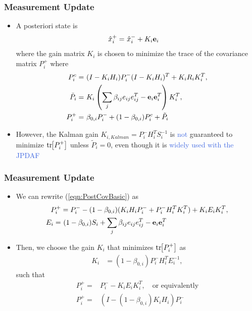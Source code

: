 \documentclass[hyperref={pdftex,pdfpagemode=none,pdfstartview=FitH},10pt]{beamer}
\newcommand{\bracket}[1]{\ensuremath{\left[ #1 \right]}}
\newcommand{\parenth}[1]{\ensuremath{\left( #1 \right)}}
\newcommand{\refeqn}[1]{(\ref{eqn:#1})}
\newcommand{\tr}[1]{\mbox{tr}\ensuremath{\negthickspace\bracket{#1}}}
\def\Emph{\textcolor{RoyalBlue}}
\begin{document}
\begin{frame}
\frametitle{Measurement Update}

\begin{itemize}
\item A posteriori state is
\begin{align}
\hat x^+_{i}=&\ \hat x^-_{i}+K_{i}{\bf{e}}_{i}
\end{align}
where the gain matrix $K_i$ is chosen to minimize the trace of the covariance matrix $P^+_{i}$ where
\begin{align}
P^c_i=&\ (I-K_iH_i)P^-_i(I-K_iH_i)^T+K_iR_iK_i^T,
\\
\tilde P_i=&\ K_i\parenth{{\sum\limits_{j} \beta_{ij}e_{ij}e_{ij}^T-{\bf{e}}_{i}}{\bf{e}}_{i}^T}K_{i}^T,
\\
P^+_{i}=&\ \beta_{0,i}P^-_{i}+(1-\beta_{0,i})P_i^c+\tilde P_i \label{eqn:PostCovBasic}
\end{align}
\item However, the Kalman gain $K_{i,Kalman}=P^-_iH_i^TS_i^{-1}$ is \Emph{not} guaranteed to minimize $\tr{P^+_{i}}$ unless $\tilde P_i=0$, even though it is \Emph{widely used with the JPDAF}
\end{itemize}

\end{frame}

\begin{frame}
\frametitle{Measurement Update}

\begin{itemize}
\item We can rewrite \refeqn{PostCovBasic} as 
\begin{align}
P^+_i&=P^-_{i}-(1-\beta_{0,i})(K_iH_iP^-_i+P^-_iH_i^TK_i^T)
+K_iE_iK_i^T,\label{eqn:CovExpanded}
\\
E_i=&\ (1-\beta_{0,i})S_i+{\sum\limits_{j} \beta_{ij}e_{ij}e_{ij}^T-{\bf{e}}_{i}}{\bf{e}}_{i}^T
\end{align}
\item Then, we choose the gain $K_i$ that minimizes $\tr{P^+_{i}}$ as
\begin{align}
K_i&=(1-\beta_{0,i})P^-_iH_i^TE_i^{-1},\label{eqn:GainK}
\end{align}
such that
\begin{align}
P^+_{i}=&P^-_{i}-K_iE_iK_i^T, \quad \mbox{or equivalently}\label{eqn:JPDAFPostCovSymmetricUpdate}
\\
P^+_{i}=&\left(I-(1-\beta_{0,i})K_iH_i\right)P^-_i\label{eqn:JPDAFPostCovSimpleUpdate}
\end{align}
\end{itemize}

\end{frame}
\end{document}
